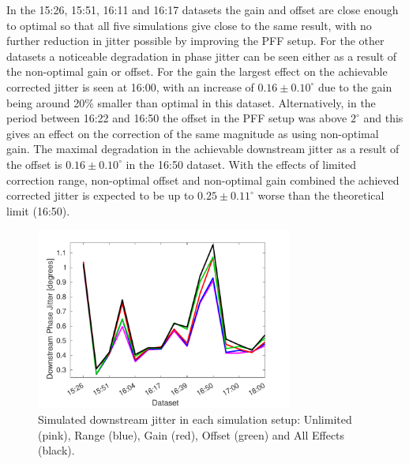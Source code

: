In the 15:26, 15:51, 16:11 and 16:17 datasets the gain and offset are close enough to optimal so that all five simulations give close to the same result, with no further reduction in jitter possible by improving the PFF setup. 
For the other datasets a noticeable degradation in phase jitter can be seen either as a result of the non-optimal gain or offset.
For the gain the largest effect on the achievable corrected jitter is seen at 16:00, with an increase of \(0.16\pm0.10^\circ\) due to the gain being around 20\% smaller than optimal in this dataset. 
Alternatively, in the period between 16:22 and 16:50 the offset in the PFF setup was above \(2^\circ\) and this gives an effect on the correction of the same magnitude as using non-optimal gain. The maximal degradation in the achievable downstream jitter as a result of the offset is \(0.16\pm0.10^\circ\) in the 16:50 dataset. 
With the effects of limited correction range, non-optimal offset and non-optimal gain combined the achieved corrected jitter is expected to be up to \(0.25\pm0.11^\circ\) worse than the theoretical limit (16:50).%


\begin{figure}
  \centering
  \includegraphics[width=0.75\textwidth]{Figures/feedforward/longFF_datSetJitSim}
  \caption{Simulated downstream jitter in each simulation setup: Unlimited (pink), Range (blue), Gain (red), Offset (green) and All Effects (black).}
  \label{f:longFF_datSetJitSim}
\end{figure}

